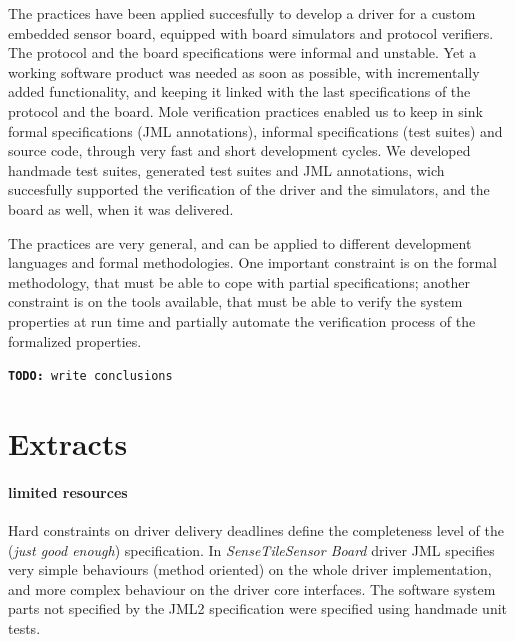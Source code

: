 \documentclass[english]{lni}
\newcommand{\todo}[1]{\texttt{\textbf{TODO:} #1}}
\newcommand{\ST}{\emph{SenseTile}\xspace}
\newcommand{\SB}{\emph{Sensor Board}\xspace}
\newcommand{\STSB}{\ST \SB\xspace}
\begin{document}
The practices have been applied succesfully to develop a driver for a custom embedded sensor board, equipped with board simulators and protocol verifiers. 
The protocol and the board specifications were informal and unstable. 
Yet a working software product was needed as soon as possible, with incrementally added functionality, and keeping it linked with the last specifications of the protocol and the board.
Mole verification practices enabled us to keep in sink formal specifications (JML annotations), informal specifications (test suites) and source code, through very fast and short development cycles.
We developed handmade test suites, generated test suites and JML annotations, wich succesfully supported the verification of the driver and the simulators, and the board as well, when it was delivered.

The practices are very general, and can be applied to different development languages and formal methodologies.
One important constraint is on the formal methodology, that must be able to cope with partial specifications; another constraint is on the tools available, that must be able to verify the system properties at run time and partially automate the verification process of the formalized properties.





\todo{write conclusions}

% 
% 


\newpage 

\section{Extracts}

\paragraph*{limited resources}

Hard constraints on driver delivery deadlines define the completeness level of the (\emph{just good enough}) specification.  
In \STSB driver JML specifies very simple behaviours (method oriented) on the whole driver implementation, and more complex behaviour on the driver core interfaces.  
The software system parts not specified by the JML2 specification were specified using handmade unit tests.
\end{document}
